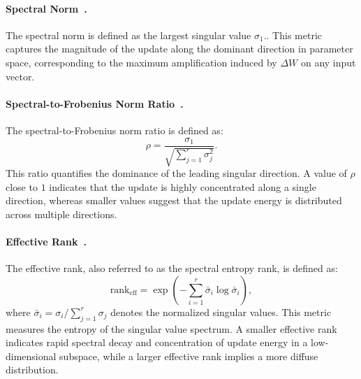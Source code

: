\documentclass{article}
\begin{document}
\paragraph{Spectral Norm~\citep{MATHIAS1990269}.}
The spectral norm is defined as the largest singular value $\sigma_1.$. This metric captures the magnitude of the update along the dominant direction in parameter space, corresponding to the maximum amplification induced by $\Delta W$ on any input vector.

\paragraph{Spectral-to-Frobenius Norm Ratio~\citep{ALNATOOR2024e30056}.}
The spectral-to-Frobenius norm ratio is defined as:
\begin{equation}
\rho = \frac{\sigma_1}{\sqrt{\sum_{j=1}^r \sigma_j^2}}.
\end{equation}
This ratio quantifies the dominance of the leading singular direction. A value of $\rho$ close to $1$ indicates that the update is highly concentrated along a single direction, whereas smaller values suggest that the update energy is distributed across multiple directions.

\paragraph{Effective Rank~\citep{item_f3c74b8f1cad43ed869604b318d58703}.}
The effective rank, also referred to as the spectral entropy rank, is defined as:
\begin{equation}
\mathrm{rank}_{\mathrm{eff}} = \exp\left(-\sum_{i=1}^r \bar{\sigma}_i \log \bar{\sigma}_i\right),
\end{equation}
where $\bar{\sigma}_i = \sigma_i / \sum_{j=1}^r \sigma_j$ denotes the normalized singular values. This metric measures the entropy of the singular value spectrum. A smaller effective rank indicates rapid spectral decay and concentration of update energy in a low-dimensional subspace, while a larger effective rank implies a more diffuse distribution.
\end{document}
